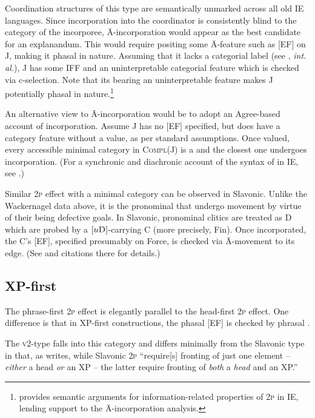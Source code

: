 \documentclass[output=paper]{langsci/langscibook}
\begin{document}
Coordination structures of this type are semantically unmarked across all old
IE languages. Since incorporation into the coordinator is consistently blind to
the category of the incorporee, Ā-incorporation would appear as the best
candidate for an explanandum. This would require positing some Ā-feature such
as [\gls{EF}]  on J, making it phasal in nature.
Assuming that it lacks a categorial label (see \citealt{Chomsky2013},
\emph{int. al.}), J has some \gls{IFF} and an
uninterpretable categorial feature  which is checked via c-selection. Note that
its bearing an uninterpretable feature makes  J
potentially phasal in nature.\footnote{\citet{Mitrovic:2014phd} provides
semantic arguments for information-related properties of \textsc{2p} in IE,
lending support to the Ā-incorporation analysis.}

An alternative view to Ā-incorporation would be to adopt an Agree-based account
of incorporation. Assume J has no [\gls{EF}] specified, but does have a
category feature without a value, as per standard assumptions. Once valued,
every accessible minimal category in \textsc{Compl}(J) is a
 and the closest one undergoes incorporation. (For a
synchronic and diachronic account of the syntax of  in IE,
see \citealt{Mitrovic:2014phd,Mitrovic:2018oup,Mitrovic:2019}.)

Similar \textsc{2p} effect with a minimal category can be observed in Slavonic.
Unlike the Wackernagel data above, it is the pronominal  that undergo
movement by virtue of their being defective goals. In Slavonic, pronominal
clitics are treated as D which are probed by a
$[u\textsc{D}]$-car\-ry\-ing C (more precisely, Fin). Once
incorporated, the C's [\gls{EF}], specified presumably on
Force, is checked via Ā-movement to its edge. (See
\citealt[386--399]{roberts:2012uq} and citations there for details.)

\subsection{XP-first}\label{subsec:XP1}

The phrase-first \textsc{2p} effect is elegantly parallel to the head-first
\textsc{2p} effect. One difference is that in XP-first constructions, the
phasal [\gls{EF}] is checked by phrasal .

The  \textsc{v2}-type falls into this category and differs minimally
from the Slavonic type in that, as \textcite[401]{roberts:2012uq} writes, while
Slavonic \textsc{2p} ``require[s] fronting of just one
element -- \emph{either} a head \emph{or} an XP -- the latter require
fronting of \emph{both} a \emph{head} and an XP.''
\end{document}
